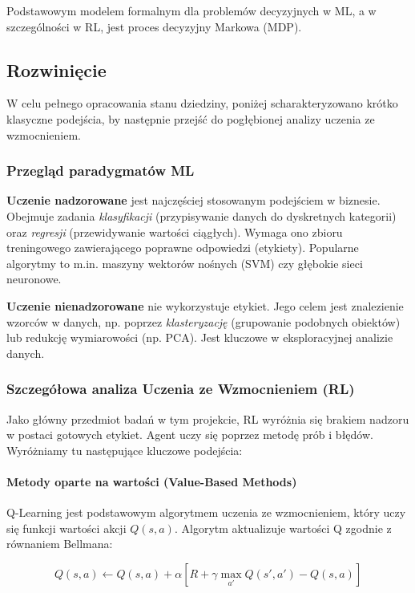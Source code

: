 \documentclass[12pt,a4paper]{article}
\begin{document}
Podstawowym modelem formalnym dla problemów decyzyjnych w ML, a w szczególności w RL, jest proces decyzyjny Markowa (MDP).

\subsection{Rozwinięcie}

W celu pełnego opracowania stanu dziedziny, poniżej scharakteryzowano krótko klasyczne podejścia, by następnie przejść do pogłębionej analizy uczenia ze wzmocnieniem.

\subsubsection{Przegląd paradygmatów ML}

\textbf{Uczenie nadzorowane} jest najczęściej stosowanym podejściem w biznesie. Obejmuje zadania \textit{klasyfikacji} (przypisywanie danych do dyskretnych kategorii) oraz \textit{regresji} (przewidywanie wartości ciągłych). Wymaga ono zbioru treningowego zawierającego poprawne odpowiedzi (etykiety). Popularne algorytmy to m.in. maszyny wektorów nośnych (SVM) czy głębokie sieci neuronowe.

\textbf{Uczenie nienadzorowane} nie wykorzystuje etykiet. Jego celem jest znalezienie wzorców w danych, np. poprzez \textit{klasteryzację} (grupowanie podobnych obiektów) lub redukcję wymiarowości (np. PCA). Jest kluczowe w eksploracyjnej analizie danych.

\subsubsection{Szczegółowa analiza Uczenia ze Wzmocnieniem (RL)}

Jako główny przedmiot badań w tym projekcie, RL wyróżnia się brakiem nadzoru w postaci gotowych etykiet. Agent uczy się poprzez metodę prób i błędów. Wyróżniamy tu następujące kluczowe podejścia:

\paragraph{Metody oparte na wartości (Value-Based Methods)}
Q-Learning jest podstawowym algorytmem uczenia ze wzmocnieniem, który uczy się funkcji wartości akcji $Q(s,a)$. Algorytm aktualizuje wartości Q zgodnie z równaniem Bellmana:

$$Q(s,a) \leftarrow Q(s,a) + \alpha \left[R + \gamma \max_{a'} Q(s',a') - Q(s,a)\right]$$
\end{document}
